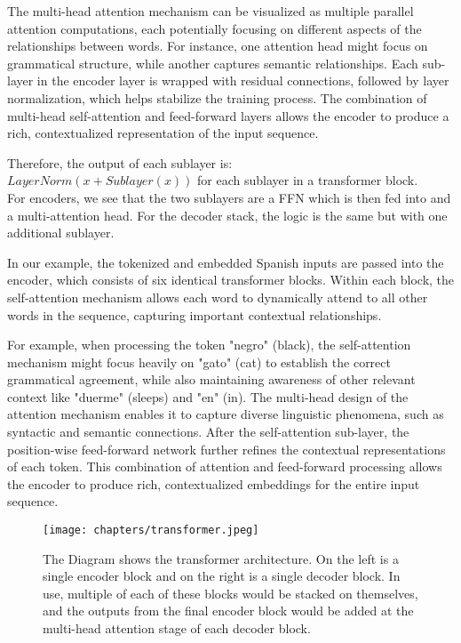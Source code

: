 The multi-head attention mechanism can be visualized as multiple parallel attention computations, each potentially focusing on different aspects of the relationships between words. For instance, one attention head might focus on grammatical structure, while another captures semantic relationships. Each sub-layer in the encoder layer is wrapped with residual connections, followed by layer normalization, which helps stabilize the training process. The combination of multi-head self-attention and feed-forward layers allows the encoder to produce a rich, contextualized representation of the input sequence. 

Therefore, the output of each sublayer is: \\
	\tab$LayerNorm(x + Sublayer(x))$ for each sublayer in a transformer block. \\
For encoders, we see that the two sublayers are a FFN which is then fed into and a multi-attention head. For the decoder stack, the logic is the same but with one additional sublayer. 

In our example, the tokenized and embedded Spanish inputs are passed into the encoder, which consists of six identical transformer blocks. Within each block, the self-attention mechanism allows each word to dynamically attend to all other words in the sequence, capturing important contextual relationships.

For example, when processing the token "negro" (black), the self-attention mechanism might focus heavily on "gato" (cat) to establish the correct grammatical agreement, while also maintaining awareness of other relevant context like "duerme" (sleeps) and "en" (in). The multi-head design of the attention mechanism enables it to capture diverse linguistic phenomena, such as syntactic and semantic connections. After the self-attention sub-layer, the position-wise feed-forward network further refines the contextual representations of each token. This combination of attention and feed-forward processing allows the encoder to produce rich, contextualized embeddings for the entire input sequence.

\begin{figure}[h!]
    \centering
    \texttt{[image: chapters/transformer.jpeg]} 
    \caption {The Diagram shows the transformer architecture. \cite{NIPS2017_3f5ee243} On the left is a single encoder block and on the right is a single decoder block. In use, multiple of each of these blocks would be stacked on themselves, and the outputs from the final encoder block would be added at the multi-head attention stage of each decoder block.}
\end{figure}


